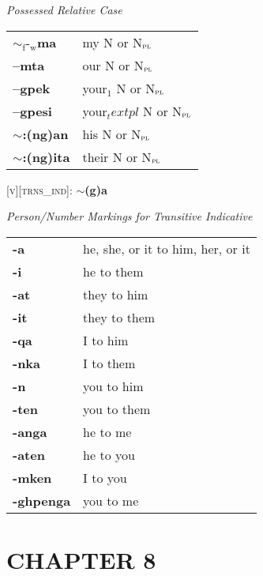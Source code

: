 \documentclass{article}
\begin{document}
\bigskip

\textit{Possessed Relative Case} \\
\begin{tabular}{ l l }
\textbf{$\sim_\text{f}\text{-}_\text{w}$ma} & my N or N$_\text{\textsc{pl}}$ \\
\textbf{--mta} &  our N or N$_\text{\textsc{pl}}$\\
\textbf{--gpek} & your$_1$ N or N$_\text{\textsc{pl}}$ \\
\textbf{--gpesi} & your$_text{pl}$ N or N$_\text{\textsc{pl}}$ \\
\textbf{$\sim$:(ng)an} & his N or N$_\text{\textsc{pl}}$ \\
\textbf{$\sim$:(ng)ita} & their N or N$_\text{\textsc{pl}}$ \\
\end{tabular}

\bigskip

\textsc{[v][trns\_ind]}: \textbf{$\sim$(g)a}

\bigskip

\textit{Person/Number Markings for Transitive Indicative}

\begin{tabular}{ l l }
\textbf{-a} & he, she, or it to him, her, or it\\
\textbf{-i} & he to them \\
\textbf{-at} & they to him \\
\textbf{-it} & they to them \\
\textbf{-qa} & I to him \\
\textbf{-nka} & I to them \\
\textbf{-n} & you to him \\
\textbf{-ten} & you to them \\
\textbf{-anga} & he to me \\
\textbf{-aten} & he to you \\
\textbf{-mken} & I to you \\
\textbf{-ghpenga} & you to me
\end{tabular}

\section{CHAPTER 8}
\end{document}
